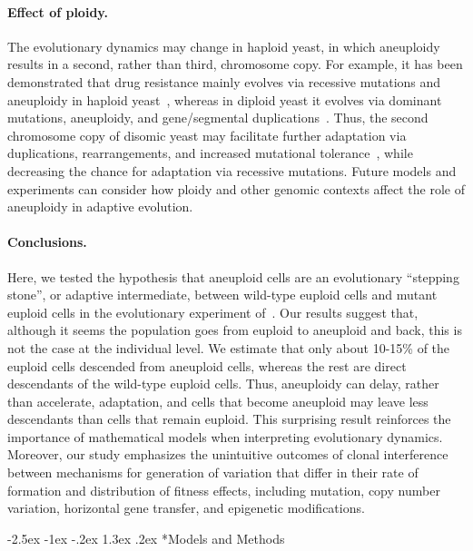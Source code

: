\documentclass[12pt]{article}
\makeatletter
\renewcommand\section{\@startsection {section}{1}{\z@}%
     {-2.5ex \@plus -1ex \@minus -.2ex}%
     {1.3ex \@plus.2ex}%
    {\Large\bfseries}}
\makeatother
\begin{document}
\paragraph{Effect of ploidy.}
The evolutionary dynamics may change in haploid yeast, in which aneuploidy results in a second, rather than third, chromosome copy. 
For example, it has been demonstrated that drug resistance mainly evolves via recessive mutations and aneuploidy in haploid yeast~\citep{Soncini2020}, whereas in diploid yeast it evolves via dominant mutations, aneuploidy, and gene/segmental duplications~\citep{Barney2021}.
Thus, the second chromosome copy of disomic yeast may facilitate further adaptation via duplications, rearrangements, and increased mutational tolerance~\citep{Avecilla2023}, while decreasing the chance for adaptation via recessive mutations. 
Future models and experiments can consider how ploidy and other genomic contexts affect the role of aneuploidy in adaptive evolution.

\paragraph{Conclusions.}
Here, we tested the hypothesis that aneuploid cells are an evolutionary ``stepping stone'', or adaptive intermediate, between wild-type euploid cells and mutant euploid cells in the evolutionary experiment of~\citet{Yona2012}. 
Our results suggest that, although it seems the population goes from euploid to aneuploid and back, this is not the case at the individual level. We estimate that only about 10-15\% of the euploid cells descended from aneuploid cells, whereas the rest are direct descendants of the wild-type euploid cells.
Thus, aneuploidy can delay, rather than accelerate, adaptation, and cells that become aneuploid may leave less descendants than cells that remain euploid. 
This surprising result reinforces the importance of mathematical models when interpreting evolutionary dynamics.
Moreover, our study emphasizes the unintuitive outcomes of clonal interference  between mechanisms for generation of variation that differ in their rate of formation and distribution of fitness effects, including mutation, copy number variation, horizontal gene transfer, and epigenetic modifications. 


\section*{Models and Methods}
\end{document}
